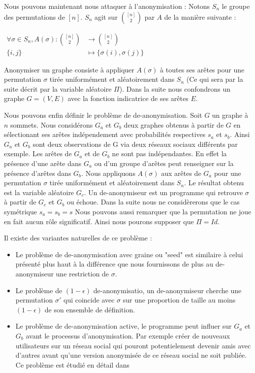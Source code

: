 \documentclass[letterpaper,10pt]{llncs}
\begin{document}
Nous pouvons maintenant nous attaquer à l'anonymisation : Notons $S_n$ le groupe des permutations de $[n]$. $S_n$ agit sur $\binom{[n]}{2}$ par $A$ de la manière suivante : 
\begin{center}
$\begin{aligned}
   \forall \sigma \in S_n, A(\sigma): \binom{[n]}{2} &\to  \binom{[n]}{2} \\
   \{i,j\} &\mapsto \{\sigma(i),\sigma(j)\}
\end{aligned}$
\end{center}
Anonymiser un graphe consiste à appliquer $A(\sigma)$ à toutes ses arêtes pour une permutation $\sigma$ tirée uniformément et aléatoirement dans $S_n$ (Ce qui sera par la suite décrit par la variable aléatoire $\Pi$). Dans la suite nous confondrons un graphe $G=(V,E)$ avec la fonction indicatrice de ses arêtes $E$.

Nous pouvons enfin définir le problème de de-anonymisation. Soit $G$ un graphe à $n$ sommets. Nous considérons $G_a$ et $G_b$ deux graphes obtenus à partir de $G$ en sélectionant ses arêtes indépendement avec probabilités respectives $s_a$ et $s_b$. Ainsi $G_a$ et $G_b$ sont deux observations de G via deux réseaux sociaux différents par exemple. Les arêtes de $G_a$ et de $G_b$ ne sont pas indépendantes. En effet la présence d'une arête dans $G_a$ ou d'un groupe d'arêtes peut renseigner sur la présence d'arêtes dans $G_b$. Nous appliquons $A(\sigma)$ aux arêtes de $G_a$ pour une permutation $\sigma$ tirée uniformément et aléatoirement dans $S_n$. Le résultat obtenu est la variable aléatoire $G_c$. Un de-anonymiseur est un programme qui retrouve $\sigma$  à partir de $G_c$ et $G_b$ ou échoue. 
Dans la suite nous ne considèrerons que le cas symétrique $s_a = s_b = s$
Nous pouvons aussi remarquer que la permutation ne joue en fait aucun rôle significatif. Ainsi nous pourons supposer que $\Pi = Id$.

Il existe des variantes naturelles de ce problème :
\begin{itemize}
\item Le problème de de-anonymisation avec graine ou "seed" est similaire à celui présenté plus haut à la différence que nous fournissons de plus au de-anonymiseur une restriction de $\sigma$.
\item Le problème de $(1-\epsilon)$ de-anonymisatio, un de-anonymiseur cherche une permutation $\sigma'$ qui coincide avec $\sigma$ sur une proportion de taille au moins $(1-\epsilon)$ de son ensemble de définition.
\item Le problème de de-anonymisation active, le programme peut influer sur $G_a$ et $G_b$ avant le processus d'anonymisation. Par exemple créer de nouveaux utilisateurs sur un réseau social qui pouront potentielement devenir amis avec d'autres avant qu'une version anonymisée de ce réseau social ne soit publiée. Ce problème est étudié en détail dans \cite{Backstrom:2007:WAT:1242572.1242598}
\end{itemize}
\end{document}

